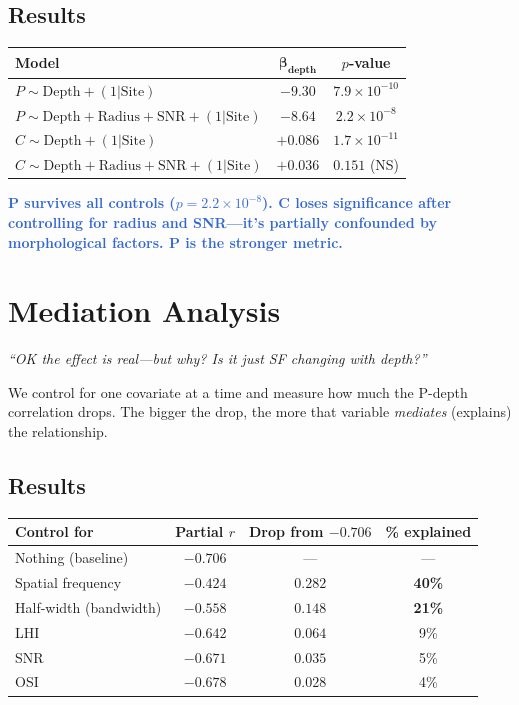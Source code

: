 \documentclass[11pt,letterpaper]{article}
\newcommand{\finding}[1]{\textcolor{highlight}{\textbf{#1}}}
\begin{document}
\subsection*{Results}
\begin{center}
\renewcommand{\arraystretch}{1.3}
\begin{tabular}{lcc}
\toprule
\textbf{Model} & $\boldsymbol{\beta_{\textbf{depth}}}$ & \textbf{$p$-value} \\
\midrule
$P \sim \text{Depth} + (1|\text{Site})$ & $-9.30$ & $7.9 \times 10^{-10}$ \\
$P \sim \text{Depth} + \text{Radius} + \text{SNR} + (1|\text{Site})$ & $-8.64$ & $2.2 \times 10^{-8}$ \\
$C \sim \text{Depth} + (1|\text{Site})$ & $+0.086$ & $1.7 \times 10^{-11}$ \\
$C \sim \text{Depth} + \text{Radius} + \text{SNR} + (1|\text{Site})$ & $+0.036$ & $0.151$ (NS) \\
\bottomrule
\end{tabular}
\end{center}

\finding{P survives all controls ($p = 2.2 \times 10^{-8}$). C loses
significance after controlling for radius and SNR---it's partially
confounded by morphological factors. P is the stronger metric.}

\newpage
\section{Mediation Analysis}
\textcolor{muted}{\textit{``OK the effect is real---but why? Is it just SF
changing with depth?''}}

We control for one covariate at a time and measure how much the P-depth
correlation drops. The bigger the drop, the more that variable
\emph{mediates} (explains) the relationship.

\subsection*{Results}
\begin{center}
\renewcommand{\arraystretch}{1.3}
\begin{tabular}{lccc}
\toprule
\textbf{Control for} & \textbf{Partial $r$} & \textbf{Drop from $-0.706$} & \textbf{\% explained} \\
\midrule
Nothing (baseline) & $-0.706$ & --- & --- \\
Spatial frequency & $-0.424$ & $0.282$ & \textbf{40\%} \\
Half-width (bandwidth) & $-0.558$ & $0.148$ & \textbf{21\%} \\
LHI & $-0.642$ & $0.064$ & 9\% \\
SNR & $-0.671$ & $0.035$ & 5\% \\
OSI & $-0.678$ & $0.028$ & 4\% \\
\bottomrule
\end{tabular}
\end{center}
\end{document}
